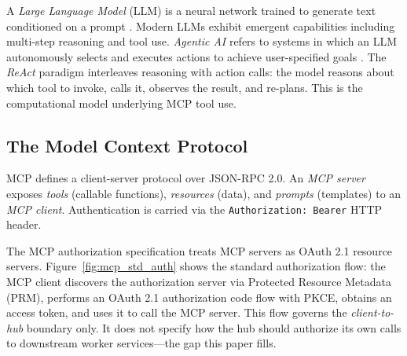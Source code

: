 \documentclass[journal]{IEEEtran}
\begin{document}
A \textit{Large Language Model} (LLM) is a neural network trained to generate
text conditioned on a prompt \cite{vaswani2017}. Modern LLMs exhibit emergent
capabilities including multi-step reasoning and tool use. \textit{Agentic AI}
refers to systems in which an LLM autonomously selects and executes actions to
achieve user-specified goals \cite{wang2024survey}. The \textit{ReAct} paradigm
\cite{yao2022react} interleaves reasoning with action calls: the model reasons
about which tool to invoke, calls it, observes the result, and re-plans. This
is the computational model underlying MCP tool use.

\subsection{The Model Context Protocol}

MCP \cite{mcp_spec} defines a client-server protocol over JSON-RPC 2.0. An
\textit{MCP server} exposes \textit{tools} (callable functions), \textit{resources}
(data), and \textit{prompts} (templates) to an \textit{MCP client}. Authentication
is carried via the \texttt{Authorization: Bearer} HTTP header.

The MCP authorization specification \cite{mcp_spec_2025} treats MCP servers as
OAuth 2.1 resource servers. Figure~\ref{fig:mcp_std_auth} shows the standard
authorization flow: the MCP client discovers the authorization server via
Protected Resource Metadata (PRM), performs an OAuth 2.1 authorization code flow
with PKCE, obtains an access token, and uses it to call the MCP server. This flow
governs the \textit{client-to-hub} boundary only. It does not specify how the hub
should authorize its own calls to downstream worker services---the gap this paper
fills.
\end{document}

